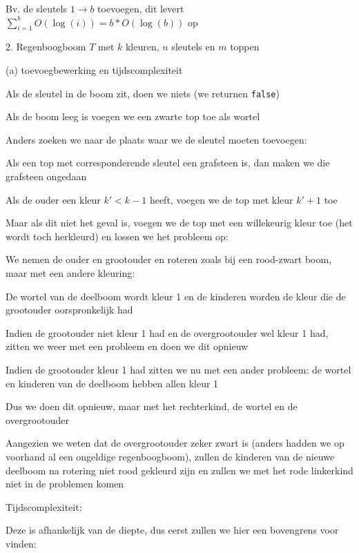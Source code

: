 \documentclass{article}
\def\code#1{\texttt{#1}}
\begin{document}
Bv. de sleutels $1 \rightarrow b$ toevoegen, dit levert $\sum_{i=1}^{b} O(\log (i)) = b * O(\log (b))$ op

\newpage

\Large 2. Regenboogboom $T$ met $k$ kleuren, $n$ sleutels en $m$ toppen
\vspace{0.5cm}

\Large (a) toevoegbewerking en tijdscomplexiteit
\vspace{0.3cm}

\large
Als de sleutel in de boom zit, doen we niets (we returnen \code{false})

Als de boom leeg is voegen we een zwarte top toe als wortel

Anders zoeken we naar de plaats waar we de sleutel moeten toevoegen:

Als een top met corresponderende sleutel een grafsteen is, dan maken we die grafsteen ongedaan

Als de ouder een kleur $k' < k - 1$ heeft, voegen we de top met kleur $k' + 1$ toe

Maar als dit niet het geval is, voegen we de top met een willekeurig kleur toe (het wordt toch herkleurd) en lossen we het probleem op:

We nemen de ouder en grootouder en roteren zoals bij een rood-zwart boom, maar met een andere kleuring:

De wortel van de deelboom wordt kleur 1 en de kinderen worden de kleur die de grootouder oorspronkelijk had

Indien de grootouder niet kleur 1 had en de overgrootouder wel kleur 1 had, zitten we weer met een probleem en doen we dit opnieuw

Indien de grootouder kleur 1 had zitten we nu met een ander probleem: de wortel en kinderen van de deelboom hebben allen kleur 1

Dus we doen dit opnieuw, maar met het rechterkind, de wortel en de overgrootouder

Aangezien we weten dat de overgrootouder zeker zwart is (anders hadden we op voorhand al een ongeldige regenboogboom), zullen de kinderen van de nieuwe deelboom na rotering niet rood gekleurd zijn en zullen we met het rode linkerkind niet in de problemen komen

\vspace{0.2cm}

Tijdscomplexiteit:

Deze is afhankelijk van de diepte, dus eerst zullen we hier een bovengrens voor vinden:
\end{document}
